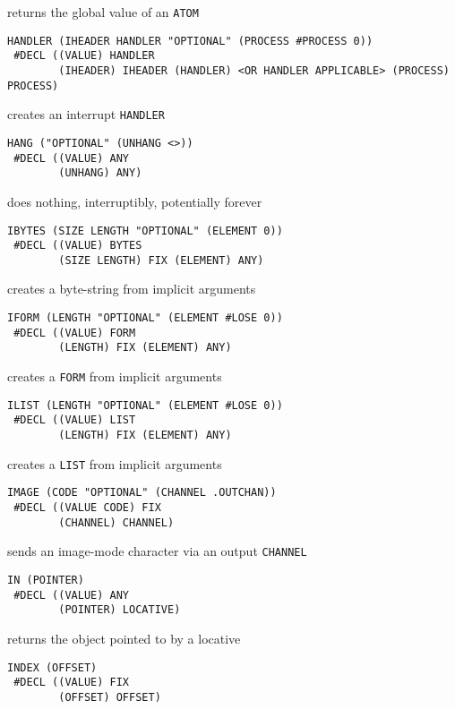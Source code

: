 \documentclass[a4paper]{scrbook}
\begin{document}
returns the global value of an \texttt{ATOM}

\begin{verbatim}
HANDLER (IHEADER HANDLER "OPTIONAL" (PROCESS #PROCESS 0))
 #DECL ((VALUE) HANDLER
        (IHEADER) IHEADER (HANDLER) <OR HANDLER APPLICABLE> (PROCESS) PROCESS)
\end{verbatim}

creates an interrupt \texttt{HANDLER}

\begin{verbatim}
HANG ("OPTIONAL" (UNHANG <>))
 #DECL ((VALUE) ANY
        (UNHANG) ANY)
\end{verbatim}

does nothing, interruptibly, potentially forever

\begin{verbatim}
IBYTES (SIZE LENGTH "OPTIONAL" (ELEMENT 0))
 #DECL ((VALUE) BYTES
        (SIZE LENGTH) FIX (ELEMENT) ANY)
\end{verbatim}

creates a byte-string from implicit arguments

\begin{verbatim}
IFORM (LENGTH "OPTIONAL" (ELEMENT #LOSE 0))
 #DECL ((VALUE) FORM
        (LENGTH) FIX (ELEMENT) ANY)
\end{verbatim}

creates a \texttt{FORM} from implicit arguments

\begin{verbatim}
ILIST (LENGTH "OPTIONAL" (ELEMENT #LOSE 0))
 #DECL ((VALUE) LIST
        (LENGTH) FIX (ELEMENT) ANY)
\end{verbatim}

creates a \texttt{LIST} from implicit arguments

\begin{verbatim}
IMAGE (CODE "OPTIONAL" (CHANNEL .OUTCHAN))
 #DECL ((VALUE CODE) FIX
        (CHANNEL) CHANNEL)
\end{verbatim}

sends an image-mode character via an output \texttt{CHANNEL}

\begin{verbatim}
IN (POINTER)
 #DECL ((VALUE) ANY
        (POINTER) LOCATIVE)
\end{verbatim}

returns the object pointed to by a locative

\begin{verbatim}
INDEX (OFFSET)
 #DECL ((VALUE) FIX
        (OFFSET) OFFSET)
\end{verbatim}
\end{document}
